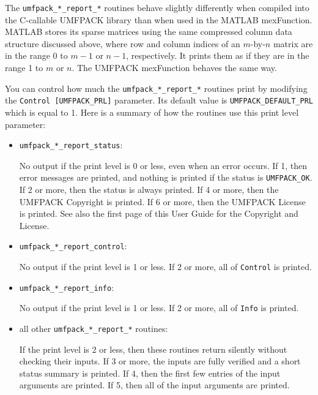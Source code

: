 The {\tt umfpack\_*\_report\_*} routines behave slightly differently when
compiled
into the C-callable UMFPACK library than when used in the MATLAB mexFunction.
MATLAB stores its sparse matrices using the same compressed column data
structure discussed above, where row and column indices of an $m$-by-$n$
matrix are in the range 0 to $m-1$ or $n-1$, respectively.
It prints them as if they are in the range 1 to $m$ or $n$.
The UMFPACK mexFunction behaves the same way.

You can control how much the {\tt umfpack\_*\_report\_*} routines print by
modifying the {\tt Control [UMFPACK\_PRL]} parameter.  Its default value is
{\tt UMFPACK\_DEFAULT\_PRL} which is equal to 1.  Here is a summary of how
the routines use this print level parameter:

\begin{itemize}
\item {\tt umfpack\_*\_report\_status}:

    No output if the print level is 0 or less, even when an error occurs.
    If 1, then error messages are printed, and nothing is printed if
    the status is {\tt UMFPACK\_OK}.  If 2 or more, then the status is always
    printed.  If 4 or more, then the UMFPACK Copyright is printed.
    If 6 or more, then the UMFPACK License is printed.  See also the first page
    of this User Guide for the Copyright and License.

\item {\tt umfpack\_*\_report\_control}:

    No output if the print level is 1 or less.  If 2 or more, all of
    {\tt Control} is printed.

\item {\tt umfpack\_*\_report\_info}:

    No output if the print level is 1 or less.  If 2 or more, all of
    {\tt Info} is printed.

\item all other {\tt umfpack\_*\_report\_*} routines:

    If the print level is 2 or less, then these routines return silently without
    checking their inputs.  If 3 or more, the inputs are fully verified and a
    short status summary is printed.  If 4, then the first few entries of the
    input arguments are printed.  If 5, then all of the input arguments are
    printed.

\end{itemize}


